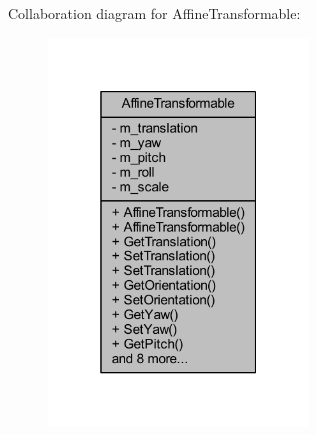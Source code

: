 Collaboration diagram for Affine\+Transformable\+:\nopagebreak
\begin{figure}[H]
\begin{center}
\leavevmode
\includegraphics[width=196pt]{class_affine_transformable__coll__graph}
\end{center}
\end{figure}
